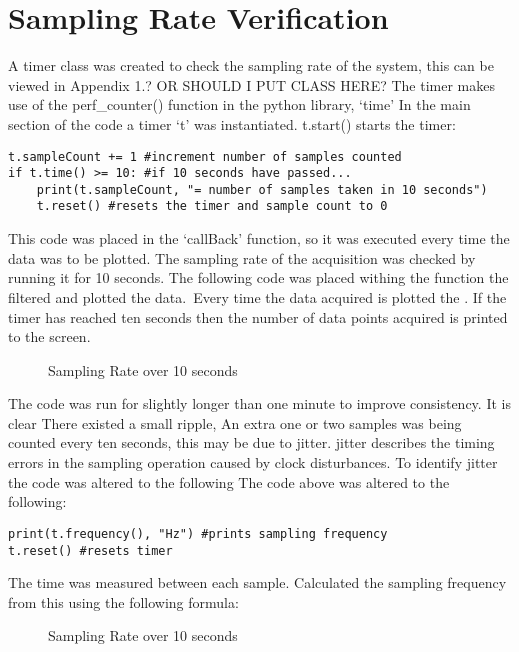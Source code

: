 \documentclass{article}
\begin{document}
\section{Sampling Rate Verification}
A timer class was created to check the sampling rate of the system, this can be viewed in Appendix 1.? OR SHOULD I PUT CLASS HERE? The timer makes use of the perf\_counter() function in the python library, `time'
In the main section of the code a timer `t' was instantiated. t.start() starts the timer:
\lstset{language=Python}
\begin{lstlisting}
t.sampleCount += 1 #increment number of samples counted
if t.time() >= 10: #if 10 seconds have passed...
    print(t.sampleCount, "= number of samples taken in 10 seconds")
    t.reset() #resets the timer and sample count to 0
\end{lstlisting}
This code was placed in the `callBack' function, so it was executed every time the data was to be plotted. The sampling rate of the acquisition was checked by running it for 10 seconds. The following code was placed withing the function the filtered and plotted the data.\
Every time the data acquired is plotted the . If the timer has reached ten seconds then the number of data points acquired is printed to the screen.\\
\newline
\begin{figure}[h!]
    \centering
    
    \caption{Sampling Rate over 10 seconds}
    \label{fig:universe}
\end{figure}
\newline 
The code was run for slightly longer than one minute to improve consistency. It is clear There existed a small ripple, An extra one or two samples was being counted every ten seconds, this may be due to jitter. jitter describes the timing errors in the sampling operation caused by clock disturbances. To identify jitter the code was altered to the following The code above was altered to the following:\\
\lstset{language=Python}
\begin{lstlisting}
print(t.frequency(), "Hz") #prints sampling frequency
t.reset() #resets timer
\end{lstlisting}
The time was measured between each sample. Calculated the sampling frequency from this using the following formula:
\newline
\begin{figure}[h!]
    \centering
    
    \caption{Sampling Rate over 10 seconds}
    \label{fig:universe}
\end{figure}
\end{document}
